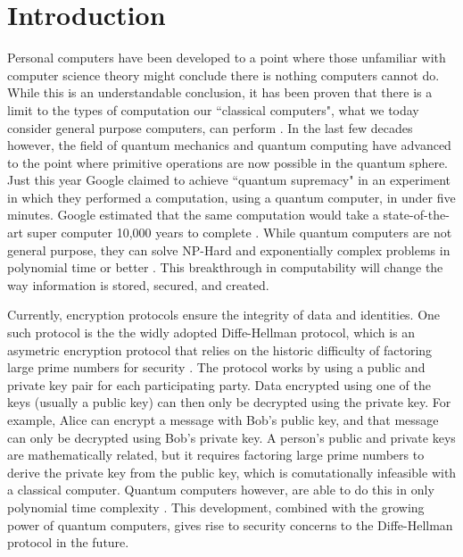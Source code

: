 \chapter{Introduction}
\label{chap:introduction}

Personal computers have been developed to a point where those unfamiliar with computer science theory might conclude there is nothing computers cannot do.
While this is an understandable conclusion, it has been proven that there is a limit to the types of computation our ``classical computers", what we today consider general purpose computers, can perform \cite{linz}.
In the last few decades however, the field of quantum mechanics and quantum computing have advanced to the point where primitive operations are now possible in the quantum sphere.
Just this year Google claimed to achieve ``quantum supremacy" in an experiment in which they performed a computation, using a quantum computer, in under five minutes. 
Google estimated that the same computation would take a state-of-the-art super computer 10,000 years to complete \cite{quantum_supremacy}. 
While quantum computers are not general purpose, they can solve NP-Hard and exponentially complex problems in polynomial time or better \cite{TODO}.
This breakthrough in computability will change the way information is stored, secured, and created.


Currently, encryption protocols ensure the integrity of data and identities.
One such protocol is the the widly adopted Diffe-Hellman protocol, which is an asymetric encryption protocol that relies on the historic difficulty of factoring large prime numbers for security \cite{qc:agi}.
The protocol works by using a public and private key pair for each participating party.
Data encrypted using one of the keys (usually a public key) can then only be decrypted using the private key.
For example, Alice can encrypt a message with Bob's public key, and that message can only be decrypted using Bob's private key.
A person's public and private keys are mathematically related, but it requires factoring large prime numbers to derive the private key from the public key, which is comutationally infeasible with a classical computer.
Quantum computers however, are able to do this in only polynomial time complexity \cite{doi:10.1137/S0036144598347011}.
This development, combined with the growing power of quantum computers, gives rise to security concerns to the Diffe-Hellman protocol in the future.

